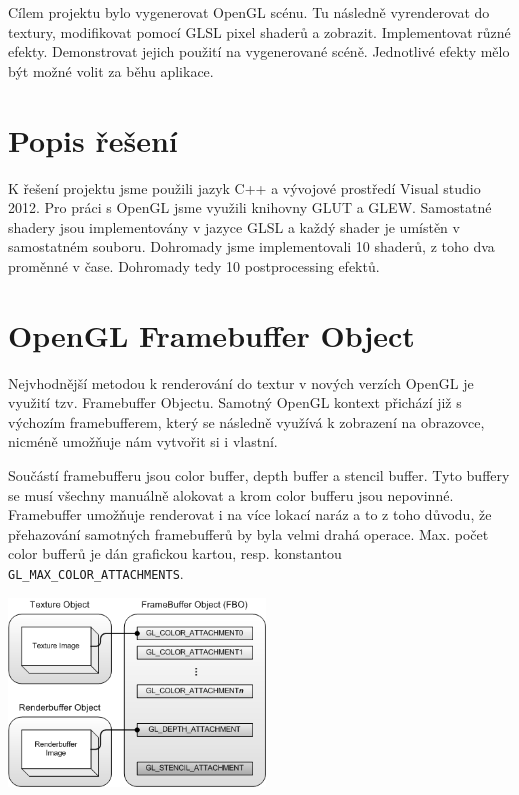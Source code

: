 \documentclass[12pt,a4paper,titlepage,final]{report}
\begin{document}
Cílem projektu bylo vygenerovat OpenGL scénu. Tu následně vyrenderovat do textury, modifikovat pomocí GLSL pixel shaderů a zobrazit. Implementovat různé efekty. Demonstrovat jejich použití na vygenerované scéně. Jednotlivé efekty mělo být možné volit za běhu aplikace.

\section{Popis řešení}

K řešení projektu jsme použili jazyk C++ a vývojové prostředí Visual studio 2012. Pro práci s OpenGL jsme využili knihovny GLUT a GLEW. Samostatné shadery jsou implementovány v jazyce GLSL a každý shader je umístěn v samostatném souboru. Dohromady jsme implementovali 10 shaderů, z toho dva proměnné v čase. Dohromady tedy 10 postprocessing efektů.

\section{OpenGL Framebuffer Object}

Nejvhodnější metodou k renderování do textur v nových verzích OpenGL je využití tzv. Framebuffer Objectu. Samotný OpenGL kontext přichází již s výchozím framebufferem, který se následně využívá k zobrazení na obrazovce, nicméně umožňuje nám vytvořit si i vlastní.

Součástí framebufferu jsou color buffer, depth buffer a stencil buffer. Tyto buffery se musí všechny manuálně alokovat a krom color bufferu jsou nepovinné. Framebuffer umožňuje renderovat i na více lokací naráz a to z toho důvodu, že přehazování samotných framebufferů by byla velmi drahá operace. Max. počet color bufferů je dán grafickou kartou, resp. konstantou \verb|GL_MAX_COLOR_ATTACHMENTS|. 

\begin{center}
	\includegraphics[height=50mm]{images/gl_fbo01.png}
\end{center}
\end{document}
